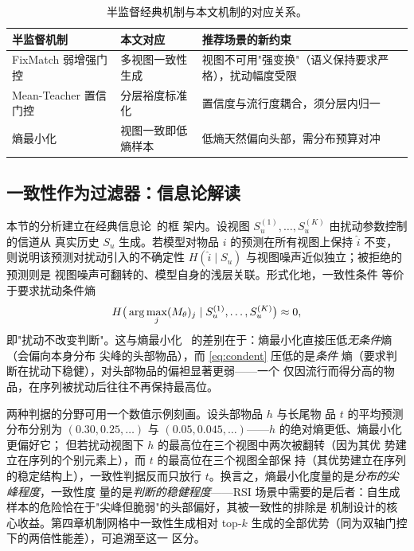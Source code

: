 \begin{table}[t]
\centering
\caption{半监督经典机制与本文机制的对应关系。}
\label{tab:sslmap}
\begin{tabular}{llp{52mm}}
\toprule
半监督机制 & 本文对应 & 推荐场景的新约束 \\
\midrule
FixMatch 弱增强门控~\cite{sohn2020fixmatch} & 多视图一致性生成
  & 视图不可用"强变换"（语义保持要求严格），扰动幅度受限 \\
Mean-Teacher 置信门控~\cite{tarvainen2017mean} & 分层裕度标准化
  & 置信度与流行度耦合，须分层内归一 \\
熵最小化~\cite{grandvalet2005entmin} & 视图一致即低熵样本
  & 低熵天然偏向头部，需分布预算对冲 \\
\bottomrule
\end{tabular}
\end{table}

\subsection{一致性作为过滤器：信息论解读}
本节的分析建立在经典信息论~\cite{shannon1948mathematical}的框
架内。设视图 $S_u^{(1)}, \dots, S_u^{(K)}$ 由扰动参数控制的信道从
真实历史 $S_u$ 生成。若模型对物品 $i$ 的预测在所有视图上保持
$\hat{i}$ 不变，则说明该预测对扰动引入的不确定性
$H(\hat{i} \mid S_u)$ 与视图噪声近似独立；被拒绝的预测则是
视图噪声可翻转的、模型自身的浅层关联。形式化地，一致性条件
等价于要求扰动条件熵
\begin{equation}\label{eq:condent}
H\big(\arg\max_j (M_{\theta})_j \mid S_u^{(1)}, \dots, S_u^{(K)}\big)
\approx 0,
\end{equation}
即"扰动不改变判断"。这与熵最小化~\cite{grandvalet2005entmin}
的差别在于：熵最小化直接压低\emph{无条件}熵（会偏向本身分布
尖峰的头部物品），而 \eqref{eq:condent} 压低的是\emph{条件}
熵（要求判断在扰动下稳健），对头部物品的偏袒显著更弱——一个
仅因流行而得分高的物品，在序列被扰动后往往不再保持最高位。

两种判据的分野可用一个数值示例刻画。设头部物品 $h$ 与长尾物
品 $t$ 的平均预测分布分别为 $(0.30, 0.25, \dots)$ 与
$(0.05, 0.045, \dots)$——$h$ 的绝对熵更低、熵最小化更偏好它；
但若扰动视图下 $h$ 的最高位在三个视图中两次被翻转（因为其优
势建立在序列的个别元素上），而 $t$ 的最高位在三个视图全部保
持（其优势建立在序列的稳定结构上），一致性判据反而只放行
$t$。换言之，熵最小化度量的是\emph{分布的尖峰程度}，一致性度
量的是\emph{判断的稳健程度}——RSI 场景中需要的是后者：自生成
样本的危险恰在于"尖峰但脆弱"的头部偏好，其被一致性的排除是
机制设计的核心收益。第四章机制网格中一致性生成相对 top-$k$
生成的全部优势（同为双轴门控下的两倍性能差），可追溯至这一
区分。

